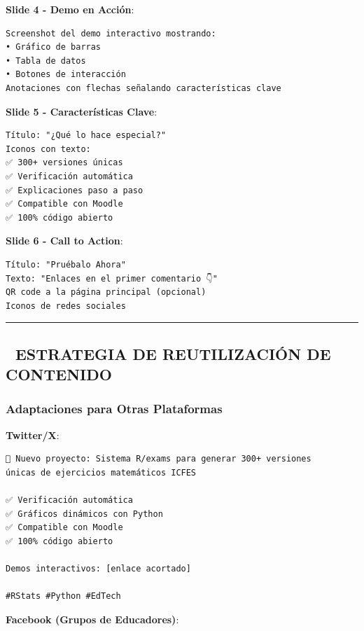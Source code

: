 \documentclass[
]{article}
\begin{document}
\textbf{Slide 4 - Demo en Acción}:

\begin{verbatim}
Screenshot del demo interactivo mostrando:
• Gráfico de barras
• Tabla de datos
• Botones de interacción
Anotaciones con flechas señalando características clave
\end{verbatim}

\textbf{Slide 5 - Características Clave}:

\begin{verbatim}
Título: "¿Qué lo hace especial?"
Iconos con texto:
✅ 300+ versiones únicas
✅ Verificación automática
✅ Explicaciones paso a paso
✅ Compatible con Moodle
✅ 100% código abierto
\end{verbatim}

\textbf{Slide 6 - Call to Action}:

\begin{verbatim}
Título: "Pruébalo Ahora"
Texto: "Enlaces en el primer comentario 👇"
QR code a la página principal (opcional)
Iconos de redes sociales
\end{verbatim}

\begin{center}\rule{0.5\linewidth}{0.5pt}\end{center}

\subsection{🔄 ESTRATEGIA DE REUTILIZACIÓN DE
CONTENIDO}\label{estrategia-de-reutilizaciuxf3n-de-contenido}

\subsubsection{Adaptaciones para Otras
Plataformas}\label{adaptaciones-para-otras-plataformas}

\textbf{Twitter/X}:

\begin{verbatim}
🎯 Nuevo proyecto: Sistema R/exams para generar 300+ versiones
únicas de ejercicios matemáticos ICFES

✅ Verificación automática
✅ Gráficos dinámicos con Python
✅ Compatible con Moodle
✅ 100% código abierto

Demos interactivos: [enlace acortado]

#RStats #Python #EdTech
\end{verbatim}

\textbf{Facebook (Grupos de Educadores)}:
\end{document}
